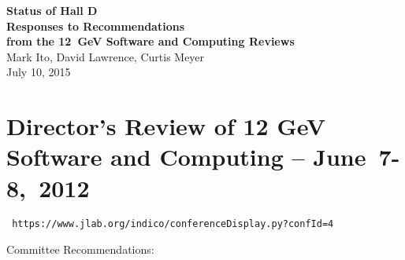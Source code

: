 \documentclass[12pt]{article}
\begin{document}
\begin{center}
  {\bf\Large Status of Hall D \\ Responses to Recommendations \\ from the 12~GeV Software and Computing Reviews} \\
  \large
  \medskip
  Mark Ito, David Lawrence, Curtis Meyer \\
  \medskip
  July 10, 2015 \\
\end{center}

\section{Director's Review of 12 GeV Software and Computing -- June~7-8,~2012}

\begin{center}\tt
https://www.jlab.org/indico/conferenceDisplay.py?confId=4
\end{center}

Committee Recommendations:
\end{document}
